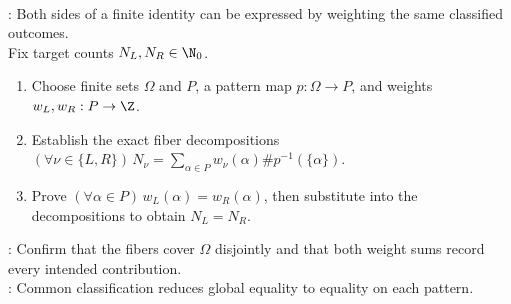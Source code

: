 \begin{method} \label{meth:combinatorial-proof-by-classification} \\
: Both sides of a finite identity can be expressed by weighting the same classified outcomes.\\
Fix target counts $N_L,N_R\in\N_0$.
\begin{enumerate}[label=(\roman*)]
\setlength{\itemsep}{0pt}
\item Choose finite sets $\Omega$ and $P$, a pattern map $p:\Omega\to P$, and weights $w_L,w_R:P\to\Z$.
\item Establish the exact fiber decompositions $(\forall \nu\in\{L,R\})\,N_\nu=\sum\limits_{\alpha\in P}w_\nu(\alpha)\#p^{-1}(\{\alpha\})$.
\item Prove $(\forall \alpha\in P)\,w_L(\alpha)=w_R(\alpha)$, then substitute into the decompositions to obtain $N_L=N_R$.
\end{enumerate}
: Confirm that the fibers cover $\Omega$ disjointly and that both weight sums record every intended contribution.\\
: Common classification reduces global equality to equality on each pattern.
\end{method}
